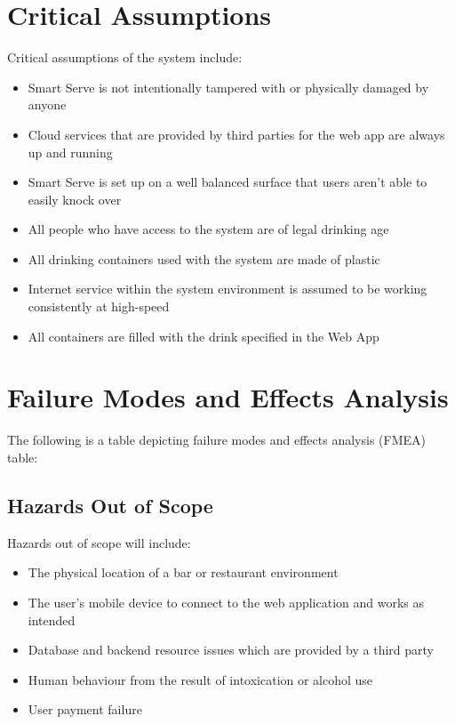 \documentclass{article}
\begin{document}
\section{Critical Assumptions}
    Critical assumptions of the system include:
    \begin{itemize}
        \item Smart Serve is not intentionally tampered with or physically damaged by anyone 
        \item Cloud services that are provided by third parties for the web app are always up and running 
        \item Smart Serve is set up on a well balanced surface that users aren't able to easily knock over
        \item All people who have access to the system are of legal drinking age 
        \item All drinking containers used with the system are made of plastic \item Internet service within the system environment is assumed to be working consistently at high-speed
        \item All containers are filled with the drink specified in the Web App
    \end{itemize}
\section{Failure Modes and Effects Analysis}
    The following is a table depicting failure modes and effects analysis (FMEA) table:
    \subsection{Hazards Out of Scope}
    Hazards out of scope will include:
    \begin{itemize}
        \item The physical location of a bar or restaurant environment
        \item The user's mobile device to connect to the web application and works as intended
        \item Database and backend resource issues which are provided by a third party
        \item Human behaviour from the result of intoxication or alcohol use 
        \item User payment failure
    \end{itemize}
    
\end{document}
